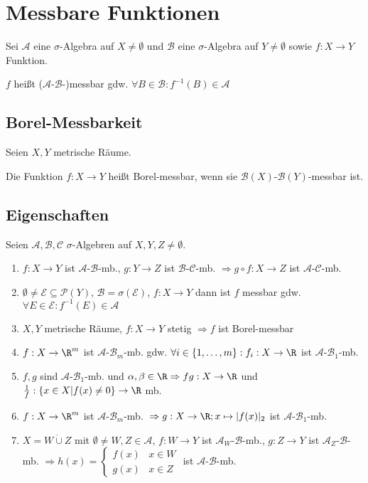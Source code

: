 \section*{Messbare Funktionen}

Sei $\mathcal{A}$ eine $\sigma$-Algebra auf $X\neq \emptyset$ und $\mathcal{B}$ eine $\sigma$-Algebra auf $Y\neq \emptyset$ sowie $f : X \rightarrow Y$ Funktion.

$f$ heißt ($\mathcal{A}$-$\mathcal{B}$-)messbar gdw. $\forall B \in \mathcal{B} : f^{-1}(B) \in \mathcal{A}$

\subsection*{Borel-Messbarkeit}

Seien $X, Y$ metrische Räume.

Die Funktion $f : X \rightarrow Y$ heißt Borel-messbar, wenn sie $\mathcal{B}(X)$-$\mathcal{B}(Y)$-messbar ist.

\subsection*{Eigenschaften}

Seien $\mathcal{A}, \mathcal{B}, \mathcal{C}$ $\sigma$-Algebren auf $X, Y, Z \neq \emptyset$.

\begin{enumerate}[label=(\alph*)]
	\item $f : X \rightarrow Y$ ist $\mathcal{A}$-$\mathcal{B}$-mb., $g : Y \rightarrow Z$ ist $\mathcal{B}$-$\mathcal{C}$-mb. $\Rightarrow g \circ f : X \rightarrow Z$ ist $\mathcal{A}$-$\mathcal{C}$-mb.
	\item $\emptyset \neq \mathcal{E} \subseteq \mathcal{P}(Y)$, $\mathcal{B} = \sigma(\mathcal{E})$, $f: X \rightarrow Y$ dann ist $f$ messbar gdw. $\forall E \in \mathcal{E} : f^{-1}(E) \in \mathcal{A}$
	\item $X, Y$ metrische Räume, $f : X \rightarrow Y$ stetig $\Rightarrow f$ ist Borel-messbar
	\item $f : X \rightarrow \R^m$ ist $\mathcal{A}$-$\mathcal{B}_m$-mb. gdw. $\forall i \in \{1, \dots, m\} : f_i : X \rightarrow \R$ ist $\mathcal{A}$-$\mathcal{B}_1$-mb.
	\item $f, g$ sind $\mathcal{A}$-$\mathcal{B}_1$-mb. und $\alpha, \beta \in \R \Rightarrow fg : X \rightarrow \R$ und $\frac{1}{f} : \{x \in X | f(x) \neq 0\} \rightarrow \R$ mb.
	\item $f : X \rightarrow \R^m$ ist $\mathcal{A}$-$\mathcal{B}_m$-mb. $\\\Rightarrow g : X \rightarrow \R; x \mapsto |f(x)|_2$ ist $\mathcal{A}$-$\mathcal{B}_1$-mb.
	\item $X = W \dot\cup Z$ mit $\emptyset \neq W, Z \in \mathcal{A}$, $f : W \rightarrow Y$ ist $\mathcal{A}_W$-$\mathcal{B}$-mb., $g : Z \rightarrow Y$ ist $\mathcal{A}_Z$-$\mathcal{B}$-mb. $\Rightarrow h(x) = \begin{cases}
	f(x) & x \in W \\
	g(x) & x \in Z
\end{cases}$ ist $\mathcal{A}$-$\mathcal{B}$-mb.
\end{enumerate}
